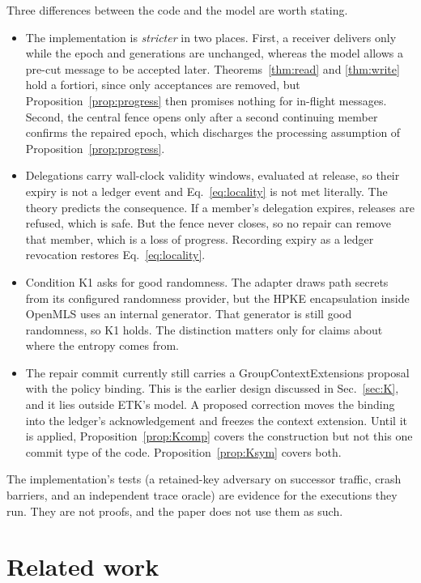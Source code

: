 \documentclass[aps,prx,reprint,superscriptaddress,nofootinbib,floatfix]{revtex4-2}
\theoremstyle{remark}
\begin{document}
Three differences between the code and the model are worth stating.
\begin{itemize}
\item The implementation is \emph{stricter} in two places. First, a receiver delivers only while the epoch and generations are unchanged, whereas the model allows a pre-cut message to be accepted later. Theorems~\ref{thm:read} and \ref{thm:write} hold a fortiori, since only acceptances are removed, but Proposition~\ref{prop:progress} then promises nothing for in-flight messages. Second, the central fence opens only after a second continuing member confirms the repaired epoch, which discharges the processing assumption of Proposition~\ref{prop:progress}.
\item Delegations carry wall-clock validity windows, evaluated at release, so their expiry is not a ledger event and Eq.~\eqref{eq:locality} is not met literally. The theory predicts the consequence. If a member's delegation expires, releases are refused, which is safe. But the fence never closes, so no repair can remove that member, which is a loss of progress. Recording expiry as a ledger revocation restores Eq.~\eqref{eq:locality}.
\item Condition K1 asks for good randomness. The adapter draws path secrets from its configured randomness provider, but the HPKE encapsulation inside OpenMLS uses an internal generator. That generator is still good randomness, so K1 holds. The distinction matters only for claims about where the entropy comes from.
\item The repair commit currently still carries a GroupContextExtensions proposal with the policy binding. This is the earlier design discussed in Sec.~\ref{sec:K}, and it lies outside ETK's model. A proposed correction moves the binding into the ledger's acknowledgement and freezes the context extension. Until it is applied, Proposition~\ref{prop:Kcomp} covers the construction but not this one commit type of the code. Proposition~\ref{prop:Ksym} covers both.
\end{itemize}

The implementation's tests (a retained-key adversary on successor traffic, crash barriers, and an independent trace oracle) are evidence for the executions they run. They are not proofs, and the paper does not use them as such.

\section{Related work}\label{sec:related}
\end{document}
